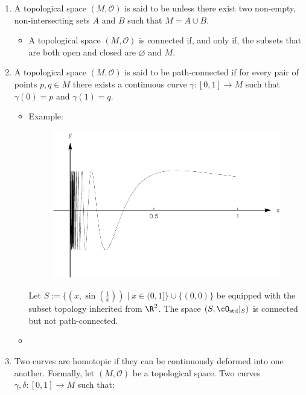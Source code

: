 \documentclass{article}
\begin{document}
\begin{enumerate}
\begin{enumerate}
      \end{enumerate}
 \item {}  A topological space $(M, \mathcal{O})$ is said to be  unless there exist two non-empty, non-intersecting  sets $A$ and $B$ such that $M=A \cup B$.
      \begin{itemize}
          \item A topological space $(M, \mathcal{O})$ is connected if, and only if, the  subsets that are both open and closed are $\varnothing$ and $M$.
      \end{itemize}
      \item {} A topological space $(M, \mathcal{O})$ is said to be path-connected if for every pair of points $p, q \in M$ there exists a continuous curve $\gamma:[0,1] \rightarrow M$ such that $\gamma(0)=p$ and $\gamma(1)=q$.
      \begin{itemize}
          \item Example: \begin{figure}
              \centering
              \includegraphics[scale=0.3]{Figs/sinoneoverx}
          \end{figure}
Let $S:=\{(x,\sin(\tfrac{1}{x}))\mid x\in (0,1]\}\cup \{(0,0)\}$ be equipped with the subset topology inherited from $\R^2$.
The space $(S,\cO_\mathrm{std}|_S)$ is connected but not path-connected.
\item {}
      \end{itemize} 
      \item {} Two curves are homotopic if they can be continuously deformed into one another. Formally, let $(M, \mathcal{O})$ be a topological space. Two curves $\gamma, \delta:[0,1] \rightarrow M$ such that:

\end{enumerate}
\end{document}

